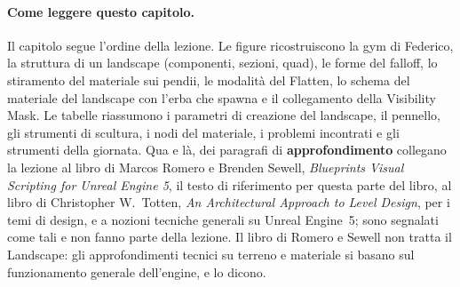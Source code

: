 \paragraph{Come leggere questo capitolo.} Il capitolo segue l'ordine della lezione. Le
figure ricostruiscono la gym di Federico, la struttura di un landscape (componenti,
sezioni, quad), le forme del falloff, lo stiramento del materiale sui pendii, le modalità
del Flatten, lo schema del materiale del landscape con l'erba che spawna e il collegamento
della Visibility Mask. Le tabelle riassumono i parametri di creazione del landscape, il
pennello, gli strumenti di scultura, i nodi del materiale, i problemi incontrati e gli
strumenti della giornata. Qua e là, dei paragrafi di \textbf{approfondimento} collegano la
lezione al libro di Marcos Romero e Brenden Sewell, \emph{Blueprints Visual Scripting for
Unreal Engine 5}, il testo di riferimento per questa parte del libro, al libro di
Christopher W.\ Totten, \emph{An Architectural Approach to Level Design}, per i temi di
design, e a nozioni tecniche generali su Unreal Engine~5; sono segnalati come tali e non
fanno parte della lezione. Il libro di Romero e Sewell non tratta il Landscape: gli
approfondimenti tecnici su terreno e materiale si basano sul funzionamento generale
dell'engine, e lo dicono.

